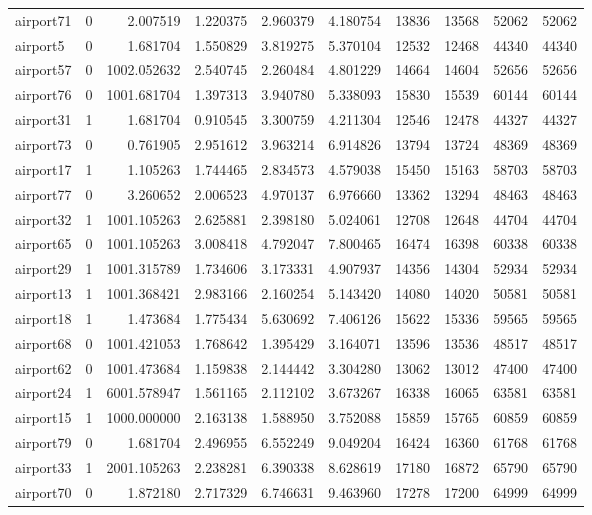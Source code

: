 \begin{longtable}{|l|r|r|r|r|r|r|r|r|r|}
airport71 & 0 & 2.007519 & 1.220375 & 2.960379 & 4.180754 & 13836 & 13568 & 52062 & 52062 \\
airport5 & 0 & 1.681704 & 1.550829 & 3.819275 & 5.370104 & 12532 & 12468 & 44340 & 44340 \\
airport57 & 0 & 1002.052632 & 2.540745 & 2.260484 & 4.801229 & 14664 & 14604 & 52656 & 52656 \\
airport76 & 0 & 1001.681704 & 1.397313 & 3.940780 & 5.338093 & 15830 & 15539 & 60144 & 60144 \\
airport31 & 1 & 1.681704 & 0.910545 & 3.300759 & 4.211304 & 12546 & 12478 & 44327 & 44327 \\
airport73 & 0 & 0.761905 & 2.951612 & 3.963214 & 6.914826 & 13794 & 13724 & 48369 & 48369 \\
airport17 & 1 & 1.105263 & 1.744465 & 2.834573 & 4.579038 & 15450 & 15163 & 58703 & 58703 \\
airport77 & 0 & 3.260652 & 2.006523 & 4.970137 & 6.976660 & 13362 & 13294 & 48463 & 48463 \\
airport32 & 1 & 1001.105263 & 2.625881 & 2.398180 & 5.024061 & 12708 & 12648 & 44704 & 44704 \\
airport65 & 0 & 1001.105263 & 3.008418 & 4.792047 & 7.800465 & 16474 & 16398 & 60338 & 60338 \\
airport29 & 1 & 1001.315789 & 1.734606 & 3.173331 & 4.907937 & 14356 & 14304 & 52934 & 52934 \\
airport13 & 1 & 1001.368421 & 2.983166 & 2.160254 & 5.143420 & 14080 & 14020 & 50581 & 50581 \\
airport18 & 1 & 1.473684 & 1.775434 & 5.630692 & 7.406126 & 15622 & 15336 & 59565 & 59565 \\
airport68 & 0 & 1001.421053 & 1.768642 & 1.395429 & 3.164071 & 13596 & 13536 & 48517 & 48517 \\
airport62 & 0 & 1001.473684 & 1.159838 & 2.144442 & 3.304280 & 13062 & 13012 & 47400 & 47400 \\
airport24 & 1 & 6001.578947 & 1.561165 & 2.112102 & 3.673267 & 16338 & 16065 & 63581 & 63581 \\
airport15 & 1 & 1000.000000 & 2.163138 & 1.588950 & 3.752088 & 15859 & 15765 & 60859 & 60859 \\
airport79 & 0 & 1.681704 & 2.496955 & 6.552249 & 9.049204 & 16424 & 16360 & 61768 & 61768 \\
airport33 & 1 & 2001.105263 & 2.238281 & 6.390338 & 8.628619 & 17180 & 16872 & 65790 & 65790 \\
airport70 & 0 & 1.872180 & 2.717329 & 6.746631 & 9.463960 & 17278 & 17200 & 64999 & 64999 \\

\end{longtable}

